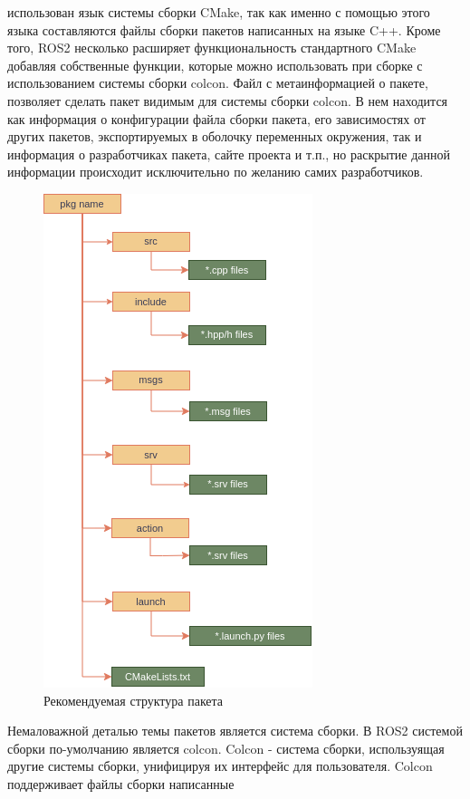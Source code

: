 \documentclass[a4paper, 14pt]{extreport}
\begin{document}
использован язык системы сборки CMake, так как именно с помощью этого языка составляются файлы сборки пакетов написанных на языке
C++. Кроме того, ROS2 несколько расширяет функциональность стандартного CMake добавляя собственные функции, которые можно использовать
при сборке с использованием системы сборки colcon. Файл с метаинформацией о пакете, позволяет сделать пакет видимым для системы 
сборки colcon. В нем находится как информация о конфигурации файла сборки пакета, его зависимостях от других пакетов, экспортируемых
в оболочку переменных окружения, так и информация о разработчиках пакета, сайте проекта и т.п., но раскрытие данной информации 
происходит исключительно по желанию самих разработчиков. 
\begin{figure}[ht]
\begin{center}
\includegraphics[scale = 0.5]{./figure/folder_schema}
\caption{Рекомендуемая структура пакета}
\label{fig:manip_photo}
\end{center}
\end{figure}
\par\noindent Немаловажной деталью темы пакетов является система сборки\cite{buildSystBook}\cite{buildSystArt}. В ROS2 системой сборки по-умолчанию является colcon. Colcon -
система сборки, используящая другие системы сборки, унифицируя их интерфейс для пользователя. Colcon поддерживает файлы сборки написанные
\end{document}
